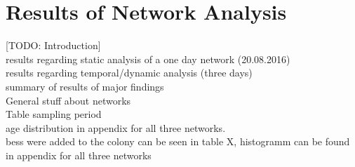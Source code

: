 \chapter{Results of Network Analysis}
\label{ch:results}

[TODO: Introduction]\\
results regarding static analysis of a one day network (20.08.2016)\\
results regarding temporal/dynamic analysis (three days)\\
summary of results of major findings\\

General stuff about networks\\
Table sampling period\\

age distribution in appendix for all three networks.\\
bess were added to the colony can be seen in table X, histogramm can be found in appendix for all three networks\\



